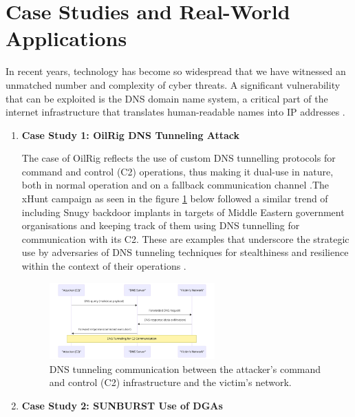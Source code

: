 \section{Case Studies and Real-World Applications}


In recent years, technology has become so widespread that we have witnessed an unmatched number and complexity of cyber threats. A significant vulnerability that can be exploited is the DNS domain name system, a critical part of the internet infrastructure that translates human-readable names into IP addresses \cite{kumari2021sac115}. 

\begin{enumerate} 

\item\textbf{ Case Study 1: OilRig DNS Tunneling Attack }

The case of OilRig reflects the use of custom DNS tunnelling protocols for command and control (C2) operations, thus making it dual-use in nature, both in normal operation and on a fallback communication channel \cite{paloaltonetworks2021dnsattacks}.The xHunt campaign as seen in the figure \ref{fig:figTen} below \cite{unit42_xhunt_2021} followed a similar trend of including Snugy backdoor implants in targets of Middle Eastern government organisations and keeping track of them using DNS tunnelling for communication with its C2.  These are examples that underscore the strategic use by adversaries of DNS tunneling techniques for stealthiness and resilience within the context of their operations \cite{unit42_2021}.

\captionsetup{font= footnotesize}
\begin{figure}[H]
    \centering
    \includegraphics[width=0.6\textwidth]{background/DNSTuu.png}
    \caption{DNS tunneling communication between the attacker's command and control (C2) infrastructure and the victim's network.}
    \label{fig:figTen}
\end{figure}


\vspace{25px}
\item\textbf{ Case Study 2: SUNBURST Use of DGAs}


\end{enumerate}
